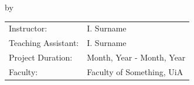 \begin{titlepage}

\begin{center}

{\makeatletter
\largetitlestyle\fontsize{45}{45}\selectfont\@title
\makeatother}

{\makeatletter
\ifdefvoid{\@subtitle}{}{\bigskip\titlestyle\fontsize{20}{20}\selectfont\@subtitle}
\makeatother}

\bigskip
\bigskip

by

\bigskip
\bigskip

{\makeatletter
\largetitlestyle\fontsize{25}{25}\selectfont\@author
\makeatother}

\bigskip
\bigskip


\vfill

\begin{tabular}{ll}
    Instructor: & I. Surname \\
    Teaching Assistant: & I. Surname \\
    Project Duration: & Month, Year - Month, Year \\
    Faculty: & Faculty of Something, UiA
\end{tabular}

\bigskip
\bigskip

\end{center}


\end{titlepage}
